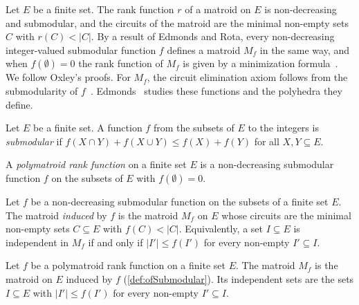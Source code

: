 Let $E$ be a finite set. The rank function $r$ of a matroid on $E$ is
non-decreasing and submodular, and the circuits of the matroid are the
minimal non-empty sets $C$ with $r(C) < |C|$. By a result of Edmonds
and Rota, every non-decreasing integer-valued submodular function $f$
defines a matroid $M_f$ in the same way, and when $f(\emptyset) = 0$
the rank function of $M_f$ is given by a minimization
formula~\cite[\S11.1]{oxley2011}. We follow Oxley's proofs. For $M_f$,
the circuit elimination axiom follows from the submodularity of
$f$~\cite[Proposition~11.1.1]{oxley2011}. Edmonds~\cite{edmonds1970}
studies these functions and the polyhedra they define.

\begin{definition}
  \label{def:submodular}
  \leanok
  Let $E$ be a finite set. A function $f$ from the subsets of $E$ to
  the integers is \emph{submodular} if
  $f(X \cap Y) + f(X \cup Y) \le f(X) + f(Y)$ for all
  $X, Y \subseteq E$.
\end{definition}

\begin{definition}
  \label{def:polymatroidFn}
  \leanok
  A \emph{polymatroid rank function} on a finite set $E$ is a
  non-decreasing submodular function $f$ on the subsets of $E$ with
  $f(\emptyset) = 0$.
\end{definition}

\begin{definition}
  \label{def:ofSubmodular}
  \leanok
  Let $f$ be a non-decreasing submodular function on the subsets of a
  finite set $E$. The matroid \emph{induced} by $f$ is the matroid
  $M_f$ on $E$ whose circuits are the minimal non-empty sets
  $C \subseteq E$ with $f(C) < |C|$. Equivalently, a set
  $I \subseteq E$ is independent in $M_f$ if and only if
  $|I'| \le f(I')$ for every non-empty $I' \subseteq I$.
\end{definition}

\begin{definition}
  \label{def:ofPolymatroidFn}
  \leanok
  Let $f$ be a polymatroid rank function on a finite set $E$. The
  matroid $M_f$ is the matroid on $E$ induced by $f$
  (\cref{def:ofSubmodular}). Its independent sets are the sets
  $I \subseteq E$ with $|I'| \le f(I')$ for every non-empty
  $I' \subseteq I$.
\end{definition}


